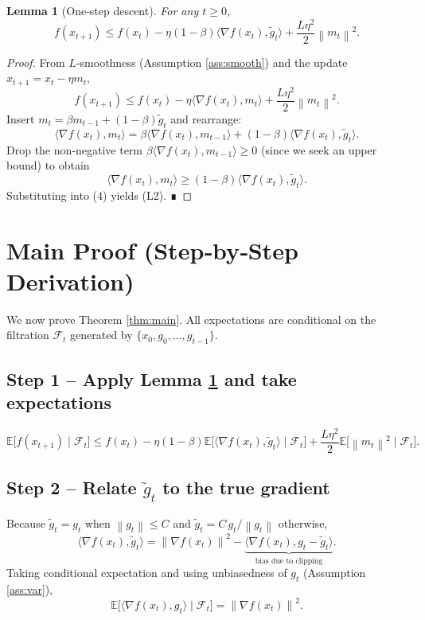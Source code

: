 \documentclass{article}
\newtheorem{lemma}{Lemma}
\newcommand{\EE}{\mathbb{E}}
\newcommand{\norm}[1]{\left\|#1\right\|}
\begin{document}
\begin{lemma}[One‑step descent]\label{lem:descent}
For any $t\ge0$,
\[
f(x_{t+1})\le f(x_{t})-\eta(1-\beta)\langle\nabla f(x_{t}),\tilde g_{t}\rangle
+\frac{L\eta^{2}}{2}\norm{m_{t}}^{2}.
\tag{L2}
\]
\end{lemma}
\begin{proof}
From $L$‑smoothness (Assumption \ref{ass:smooth}) and the update $x_{t+1}=x_{t}-\eta m_{t}$,
\[
f(x_{t+1})\le f(x_{t})-\eta\langle\nabla f(x_{t}),m_{t}\rangle+\frac{L\eta^{2}}{2}\norm{m_{t}}^{2}.
\tag{4}
\]
Insert $m_{t}= \beta m_{t-1}+(1-\beta)\tilde g_{t}$ and rearrange:
\[
\langle\nabla f(x_{t}),m_{t}\rangle
= \beta\langle\nabla f(x_{t}),m_{t-1}\rangle+(1-\beta)\langle\nabla f(x_{t}),\tilde g_{t}\rangle.
\]
Drop the non‑negative term $\beta\langle\nabla f(x_{t}),m_{t-1}\rangle\ge0$ (since we seek an upper bound) to obtain
\[
\langle\nabla f(x_{t}),m_{t}\rangle\ge (1-\beta)\langle\nabla f(x_{t}),\tilde g_{t}\rangle.
\]
Substituting into (4) yields (L2). ∎
\end{proof}

\section*{Main Proof (Step‑by‑Step Derivation)}
We now prove Theorem \ref{thm:main}. All expectations are conditional on the filtration $\mathcal{F}_{t}$ generated by $\{x_{0},g_{0},\dots,g_{t-1}\}$.

\subsection*{Step 1 – Apply Lemma \ref{lem:descent} and take expectations}
\[
\EE\!\bigl[f(x_{t+1})\mid\mathcal{F}_{t}\bigr]
\le f(x_{t})-\eta(1-\beta)\EE\!\bigl[\langle\nabla f(x_{t}),\tilde g_{t}\rangle\mid\mathcal{F}_{t}\bigr]
+\frac{L\eta^{2}}{2}\EE\!\bigl[\norm{m_{t}}^{2}\mid\mathcal{F}_{t}\bigr].
\tag{5}
\]

\subsection*{Step 2 – Relate $\tilde g_{t}$ to the true gradient}
Because $\tilde g_{t}=g_{t}$ when $\norm{g_{t}}\le C$ and $ \tilde g_{t}=C\,g_{t}/\norm{g_{t}}$ otherwise,
\[
\langle\nabla f(x_{t}),\tilde g_{t}\rangle
= \norm{\nabla f(x_{t})}^{2} - \underbrace{\langle\nabla f(x_{t}),g_{t}-\tilde g_{t}\rangle}_{\text{bias due to clipping}}.
\tag{6}
\]
Taking conditional expectation and using unbiasedness of $g_{t}$ (Assumption \ref{ass:var}),
\[
\EE\!\bigl[\langle\nabla f(x_{t}),g_{t}\rangle\mid\mathcal{F}_{t}\bigr]=\norm{\nabla f(x_{t})}^{2}.
\tag{7}
\]
\end{document}
